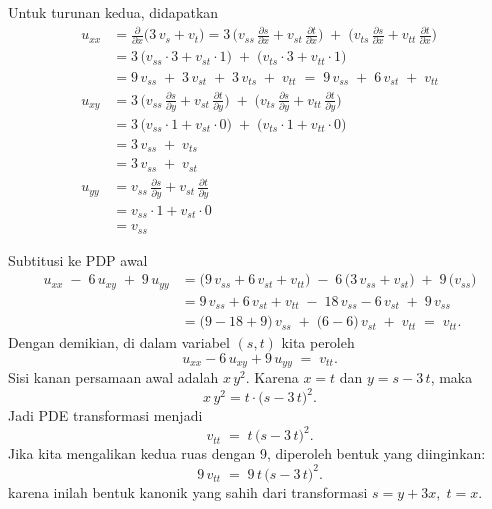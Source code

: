 \documentclass[a4paper]{article}
\theoremstyle{definition}
\begin{document}
\begin{enumerate}
\begin{enumerate}
Untuk turunan kedua, didapatkan
   \begin{align*}
      u_{xx} 
     &= \frac{\partial}{\partial x}\bigl(3\,v_{s} + v_{t}\bigr) 
     = 3\,\bigl(v_{ss}\,\tfrac{\partial s}{\partial x} + v_{st}\,\tfrac{\partial t}{\partial x}\bigr)
       \;+\; \bigl(v_{ts}\,\tfrac{\partial s}{\partial x} + v_{tt}\,\tfrac{\partial t}{\partial x}\bigr)\\
     &= 3\,\bigl(v_{ss}\cdot 3 + v_{st}\cdot 1\bigr) \;+\; \bigl(v_{ts}\cdot 3 + v_{tt}\cdot 1\bigr)\\
     &= 9\,v_{ss} \;+\; 3\,v_{st} \;+\; 3\,v_{ts} \;+\; v_{tt}
     \;=\; 9\,v_{ss} \;+\; 6\,v_{st} \;+\; v_{tt}\\
     u_{xy}
     &= 3\,\bigl(v_{ss}\,\tfrac{\partial s}{\partial y} + v_{st}\,\tfrac{\partial t}{\partial y}\bigr)
       \;+\; \bigl(v_{ts}\,\tfrac{\partial s}{\partial y} + v_{tt}\,\tfrac{\partial t}{\partial y}\bigr)\\
     &= 3\,\bigl(v_{ss}\cdot 1 + v_{st}\cdot 0\bigr) \;+\; \bigl(v_{ts}\cdot 1 + v_{tt}\cdot 0\bigr) \\
     &= 3\,v_{ss} \;+\; v_{ts} \\
     &= 3\,v_{ss} \;+\; v_{st}\\
     u_{yy} 
     &= v_{ss}\,\frac{\partial s}{\partial y} + v_{st}\,\frac{\partial t}{\partial y}\\
     &= v_{ss}\cdot 1 + v_{st}\cdot 0 \\
     &= v_{ss}
   \end{align*}

  Subtitusi ke PDP awal
   \[
   \begin{aligned}
   u_{xx} \;-\; 6\,u_{xy} \;+\; 9\,u_{yy}
   &= \bigl(9\,v_{ss} + 6\,v_{st} + v_{tt}\bigr) 
     \;-\; 6\,\bigl(3\,v_{ss} + v_{st}\bigr) 
     \;+\; 9\,\bigl(v_{ss}\bigr) \\[6pt]
   &= 9\,v_{ss} + 6\,v_{st} + v_{tt} 
     \;-\; 18\,v_{ss} - 6\,v_{st} 
     \;+\; 9\,v_{ss} \\[4pt]
   &= \bigl(9 - 18 + 9\bigr)\,v_{ss} 
     \;+\;\bigl(6 - 6\bigr)\,v_{st} 
     \;+\; v_{tt}
   \;=\; v_{tt}.
   \end{aligned}
   \]
   Dengan demikian, di dalam variabel \((s,t)\) kita peroleh
   \[
   u_{xx} - 6\,u_{xy} + 9\,u_{yy} 
   \;=\; v_{tt}.
   \]
   Sisi kanan persamaan awal adalah \( x\,y^{2} \). Karena \(x = t\) dan \(y = s - 3\,t\), maka
   \[
   x\,y^{2} 
   = t \cdot \bigl(s - 3\,t\bigr)^{2}.
   \]
   Jadi PDE transformasi menjadi
   \[
   v_{tt} \;=\; t\,\bigl(s - 3\,t\bigr)^{2}.
   \]
   Jika kita mengalikan kedua ruas dengan 9, diperoleh bentuk yang diinginkan:
   \[
   9\,v_{tt} \;=\; 9\,t\,\bigl(s - 3\,t\bigr)^{2}.
   \]
   karena inilah bentuk kanonik yang sahih dari transformasi \(s=y+3x,\;t=x\).


\end{enumerate}
\end{enumerate}
\end{document}
